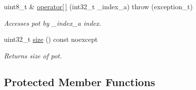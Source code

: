 \begin{DoxyCompactItemize}
uint8\+\_\+t \& \hyperlink{class_n_h_1_1_protocols_1_1_raw_1_1pot__t_a407f77712662868c1646f1a7c44e545a}{operator\mbox{[}$\,$\mbox{]}} (int32\+\_\+t \+\_\+index\+\_\+a)  throw (exception\+\_\+t)
\begin{DoxyCompactList}\small\item\em Accesses pot by {\ttfamily \+\_\+index\+\_\+a} index. \end{DoxyCompactList}\item 
uint32\+\_\+t \hyperlink{class_n_h_1_1_protocols_1_1_raw_1_1pot__t_a57a62cf7952f487a5ef513fabc2cdeed}{size} () const noexcept
\begin{DoxyCompactList}\small\item\em Returns size of pot. \end{DoxyCompactList}\end{DoxyCompactItemize}
\subsection*{Protected Member Functions}
